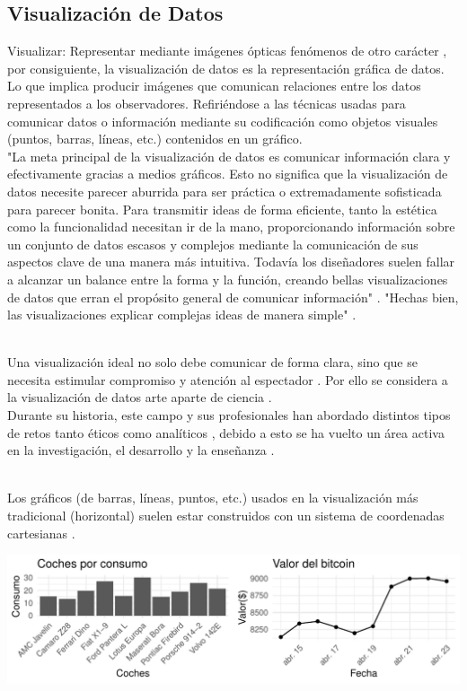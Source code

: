 \documentclass{article}\usepackage[]{graphicx}\usepackage[]{color}
\makeatletter
\def\maxwidth{ %
  \ifdim\Gin@nat@width>\linewidth
    \linewidth
  \else
    \Gin@nat@width
  \fi
}
\newenvironment{knitrout}{}{} %
\makeatother
\begin{document}
\subsection{Visualizaci\'on de Datos}
Visualizar: Representar mediante im\'agenes \'opticas fen\'omenos de otro car\'acter\cite{rae}
, por consiguiente, la visualizaci\'on de datos es la representaci\'on gr\'afica de datos. Lo que implica producir im\'agenes que comunican relaciones entre los datos representados a los observadores. Refiri\'endose a las t\'ecnicas usadas para comunicar datos o informaci\'on mediante su codificaci\'on como objetos visuales (puntos, barras, l\'ineas, etc.) contenidos en un gr\'afico.~\\
"La meta principal de la visualizaci\'on de datos es comunicar informaci\'on clara y efectivamente gracias a medios gr\'aficos. Esto no significa que la visualizaci\'on de datos necesite parecer aburrida para ser pr\'actica o extremadamente sofisticada para parecer bonita. Para transmitir ideas de forma eficiente, tanto la est\'etica como la funcionalidad necesitan ir de la mano, proporcionando informaci\'on sobre un conjunto de datos escasos y complejos mediante la comunicaci\'on de sus aspectos clave de una manera m\'as intuitiva. Todav\'ia los dise\~nadores suelen fallar a alcanzar un balance entre la forma y la funci\'on, creando bellas visualizaciones de datos que erran el prop\'osito general de comunicar informaci\'on"\cite[Vitaly Friedman]{vitaly}
. "Hechas bien, las visualizaciones explicar complejas ideas de manera simple"\cite[Thomas Powell, CEO de ZingChart]{zingchart}
.~\\~\par
Una visualizaci\'on ideal no solo debe comunicar de forma clara, sino que se necesita estimular compromiso y atenci\'on al espectador\cite{sexy}
. Por ello se considera a la visualizaci\'on de datos arte aparte de ciencia\cite{moma}\cite{art}
.~\\
Durante su historia, este campo y sus profesionales han abordado distintos tipos de retos tanto \'eticos como anal\'iticos\cite{history}
, debido a esto se ha vuelto un \'area activa en la investigaci\'on, el desarrollo y la ense\~nanza\cite{articulos}
.~\\~\par
Los gr\'aficos (de barras, l\'ineas, puntos, etc.) usados en la visualizaci\'on m\'as tradicional (horizontal) suelen estar construidos con un sistema de coordenadas cartesianas\cite{coord_carte}
.~\\
\begin{knitrout}
\color{fgcolor}

{\centering \includegraphics[width=\maxwidth]{figure/examples_carte-1} 

}



\end{knitrout}
\end{document}
